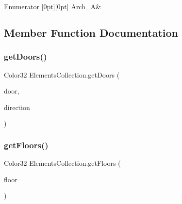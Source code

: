 \begin{DoxyEnumFields}{Enumerator}
[0pt][0pt]{}\mbox{\label{class_elements_collection_ab13b688210e7e8a238d0fcda6c22ee59ac9f2b0c2c92173eb23e352b8d6f2f056}} 
Arch\+\_\+A&\\
\hline

\end{DoxyEnumFields}


\subsection{Member Function Documentation}
\mbox{\label{class_elements_collection_acf49ed1252bb6f6dffdfa70fb5da5ecc}} 
\subsubsection{\texorpdfstring{get\+Doors()}{getDoors()}}
{\footnotesize\ttfamily Color32 Elements\+Collection.\+get\+Doors (\begin{DoxyParamCaption}\item[{\mbox{\hyperlink{class_elements_collection_a21917dc4f24ee93da7275d2fd256d0ff}{Doors}}}]{door,  }\item[{\mbox{\hyperlink{_directions_enum_8cs_a6bd1f747985f3fcfa3faca85ff3fd8e8}{Directions\+Enum}}}]{direction }\end{DoxyParamCaption})}

\mbox{\label{class_elements_collection_afa01e105e1cb767d887b3241c403e134}} 
\subsubsection{\texorpdfstring{get\+Floors()}{getFloors()}}
{\footnotesize\ttfamily Color32 Elements\+Collection.\+get\+Floors (\begin{DoxyParamCaption}\item[{\mbox{\hyperlink{class_elements_collection_acf60df237ffe824b0271fa124c804996}{Floors}}}]{floor }\end{DoxyParamCaption})}

